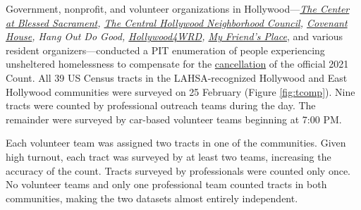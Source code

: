\documentclass[11pt]{article}
\def\resp{respectively}
\begin{document}

 Government, nonprofit, and volunteer organizations in Hollywood---{\it \href{https://thecenterinhollywood.org}
{The Center at Blessed Sacrament}, \href{https://chnc.org}{The Central Hollywood Neighborhood Council}, 
\href{https://www.covenanthouse.org/spring-meal-match?sourceid=2483460&origin=DHQEI2109EZI0N&utm_source=2103marchmealmatchweb&utm_medium=cpc&utm_campaign=FY21MarchMealMatch&utm_content=bsd2103marchmealmatchweb&gclid=CjwKCAiAp4KCBhB6EiwAxRxbpJA2yM7lM2tyAqjVALZgBGvjnhobCJJ0XmuELFDXzM5xxZ0BqyX1ChoCLi0QAvD_BwE}{Covenant House}, 
Hang Out Do Good, \href{https://hollywood4wrd.live}{Hollywood4WRD}, 
 \href{https://www.myfriendsplace.org/}{My Friend's Place}}, and various resident organizers---conducted 
a PIT enumeration of people experiencing unsheltered homelessness to compensate for 
the \href{https://laist.com/latest/post/20201209/LAHSA-cancels-2021-homeless-count-los-angeles-covid-19}
{cancellation} of the official 2021 Count. All 39 US Census tracts in the LAHSA-recognized Hollywood 
and East Hollywood communities were surveyed on 25 February (Figure \ref{fig:tcomp}). Nine tracts 
were counted by professional outreach teams during the %
day. The remainder were surveyed by car-based volunteer teams beginning at 7:00 PM.

Each volunteer team was assigned two tracts in one of the communities. Given high turnout, each tract was 
surveyed by at least two teams, increasing the accuracy of the count. Tracts 
surveyed by professionals were counted only once. No volunteer teams and only one professional team counted 
tracts in both communities, making the two datasets almost entirely independent.
\end{document}
